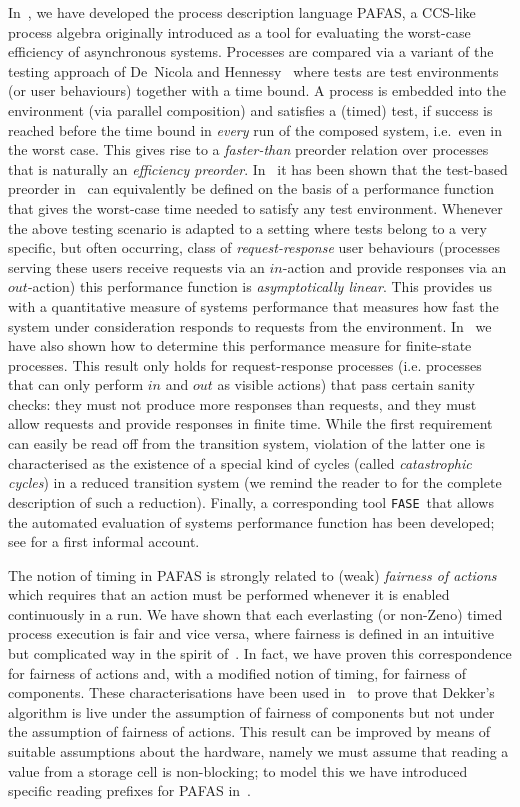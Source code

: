 \documentclass[copyright,creativecommons]{eptcs}
\newcommand{\fase}{\texttt{FASE}}
\begin{document}
In~\cite{CVJ02}, we have developed the process description language PAFAS,
a CCS-like~\cite{Mil89} process algebra  originally introduced as a tool
for evaluating the worst-case efficiency of asynchronous systems. Processes
are compared via a variant of the testing approach of De~Nicola and
Hennessy~\cite{DH84} where tests are test environments (or user behaviours)
together with a time bound. A process is embedded into the environment (via
parallel composition) and satisfies a (timed) test, if success is reached
before the time bound in {\em every} run of the composed system, i.e.\ even
in the worst case. This gives rise to a {\em faster-than} preorder relation
over processes that is naturally an {\it efficiency preorder}.
In~\cite{CV05} it has been shown that the test-based preorder
in~\cite{CVJ02} can equivalently be defined on the basis of a performance
function that gives the worst-case time needed to satisfy any test
environment. Whenever the above testing scenario is adapted to a setting
where tests belong to a very specific, but often occurring, class of {\em
request-response} user behaviours (processes serving these users receive
requests via an $in$-action and provide responses via an $out$-action) this
performance function is {\em asymptotically linear}. This provides us with
a quantitative measure of systems performance
that measures how fast the system under consideration responds to requests
from the environment. In~\cite{CV05} we have also shown how to determine
this performance measure for finite-state processes. This result only holds
for request-response processes (i.e. processes that can only perform $in$
and $out$ as visible actions) that pass certain sanity checks: they must
not produce more responses than requests, and they must allow requests and
provide responses in finite time. While the first requirement can easily
be read off from the transition system, violation of the latter one
is characterised as the existence of a special kind of cycles (called
{\em catastrophic cycles}) in a reduced transition system (we remind the reader to \cite{CV05} for the complete description of such a reduction).
Finally, a corresponding tool \fase\ that allows the automated
evaluation of systems performance function has been developed; see
\cite{BCCDV09} for a first informal account. 

The notion of timing in PAFAS is strongly related to (weak) {\em fairness
of actions} which requires that an action must be performed whenever it is
enabled continuously in a run. We have shown that each everlasting (or
non-Zeno) timed process execution is fair and vice versa, where fairness is
defined in an intuitive but complicated way in the spirit
of~\cite{CostaS84,CostaS87}. In fact, we have proven this correspondence
for fairness of actions and, with a modified notion of timing, for fairness
of components. These characterisations have been used in~\cite{CDV06} to
prove that Dekker's algorithm is live under the assumption of fairness of components
but not under the assumption of fairness of actions. This result can be
improved by means of suitable assumptions about the hardware, namely we
must assume that reading a value from a storage cell is non-blocking; to
model this we have introduced specific reading prefixes for PAFAS
in~\cite{CDV08tr}. 
\end{document}
